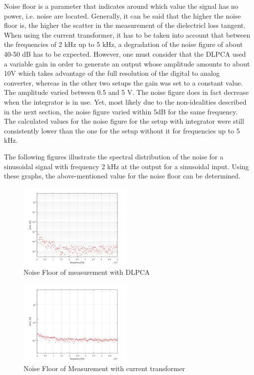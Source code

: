 Noise floor is a parameter that indicates around which value the signal has no power, i.e. noise are located. Generally, it can be said that the higher the noise floor is,
the higher the scatter in the measurement of the dielectricl loss tangent.\cite{FaerberMVISS}
When using the current transformer, it has to be taken into account that between the frequencies of 2 kHz up to 5 kHz, a degradation of the noise
figure of about 40-50 dB has to be expected. However, one must consider that the DLPCA used a variable gain in order to generate an output whose amplitude amounts to about 10V which takes advantage of the full resolution of the 
digital to analog converter, whereas in the other two setups the gain was set to a constant value. The amplitude varied between 0.5 and 5 V. 
The noise figure does in fact decrease when the integrator is in use. Yet, most likely due to the non-idealities described in the next section, the noise figure varied within 5dB for the same frequency. 
The calculated values for the noise figure for the setup with integrator were still consistently lower than the one for the setup without it for frequencies up to 5 kHz.

The following figures illustrate the spectral distribution of the noise for a sinusoidal signal with frequency 2 kHz at the output for a sinusoidal input. Using these graphs, the above-mentioned value for the noise floor can be determined.


\begin{figure}[htbp]
 \centering
 \centerline{\includegraphics[width=0.5\textwidth]{figures/Results/NoiseFloor/DLPCA.jpg}}

\caption[Kurze Abbildungsbeschreibung]{Noise Floor of measurement with DLPCA }
\label{fig.noisefloordlpca}
\end{figure}

\begin{figure}[htbp]
 \centering
 \centerline{\includegraphics[width=0.5\textwidth]{figures/Results/NoiseFloor/currenttransformer.jpg}}

\caption[Kurze Abbildungsbeschreibung]{Noise Floor of Measurement with current transformer }
\label{fig.noisefloorcurrentt}
\end{figure}

